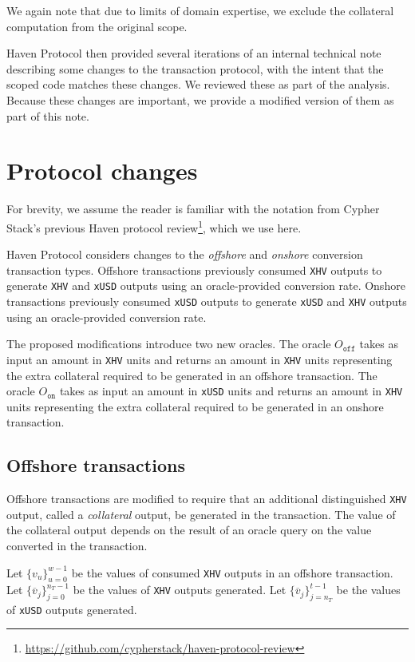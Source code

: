 \documentclass{article}
\newcommand{\ooff}{O_{\texttt{off}}}
\newcommand{\oon}{O_{\texttt{on}}}
\begin{document}
We again note that due to limits of domain expertise, we exclude the collateral computation from the original scope.

Haven Protocol then provided several iterations of an internal technical note describing some changes to the transaction protocol, with the intent that the scoped code matches these changes.
We reviewed these as part of the analysis.
Because these changes are important, we provide a modified version of them as part of this note.


\section{Protocol changes}

For brevity, we assume the reader is familiar with the notation from Cypher Stack's previous Haven protocol review\footnote{\url{https://github.com/cypherstack/haven-protocol-review}}, which we use here.

Haven Protocol considers changes to the \textit{offshore} and \textit{onshore} conversion transaction types.
Offshore transactions previously consumed \texttt{XHV} outputs to generate \texttt{XHV} and \texttt{xUSD} outputs using an oracle-provided conversion rate.
Onshore transactions previously consumed \texttt{xUSD} outputs to generate \texttt{xUSD} and \texttt{XHV} outputs using an oracle-provided conversion rate.

The proposed modifications introduce two new oracles.
The oracle $\ooff$ takes as input an amount in \texttt{XHV} units and returns an amount in \texttt{XHV} units representing the extra collateral required to be generated in an offshore transaction.
The oracle $\oon$ takes as input an amount in \texttt{xUSD} units and returns an amount in \texttt{XHV} units representing the extra collateral required to be generated in an onshore transaction.


\subsection{Offshore transactions}

Offshore transactions are modified to require that an additional distinguished \texttt{XHV} output, called a \textit{collateral} output, be generated in the transaction.
The value of the collateral output depends on the result of an oracle query on the value converted in the transaction.

Let $\{v_u\}_{u=0}^{w-1}$ be the values of consumed \texttt{XHV} outputs in an offshore transaction.
Let $\{\overline{v}_j\}_{j=0}^{n_T-1}$ be the values of \texttt{XHV} outputs generated.
Let $\{\overline{v}_j\}_{j=n_T}^{t-1}$ be the values of \texttt{xUSD} outputs generated.
\end{document}
